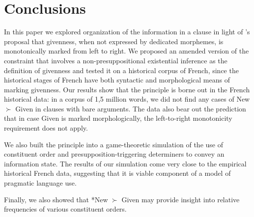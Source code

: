 \documentclass[output=paper,modfonts,nonflat]{langsci/langscibook}
\begin{document}
\section{Conclusions}
\label{section:conclusions}



In this paper we explored organization of the information in a clause in light of \citet{Kucerova:2012}'s proposal that givenness, when not expressed by dedicated morphemes, is monotonically marked from left to right. We proposed an amended version of the constraint that involves a non-presuppositional existential inference as the definition of givenness and tested it on a historical corpus of French, since the historical stages of French have both syntactic and \linebreak morphological means of marking givenness. Our results show that the principle is borne out in the French historical data: in a corpus of 1,5 million words, we did not find any cases of New $\succ$ Given in clauses with bare arguments. The data also bear out the prediction that in case Given is marked morphologically, the left-to-right monotonicity requirement does not apply.

We also built the principle into a game-theoretic simulation of the use of constituent order and presupposition-triggering determiners to convey an information state. The results of our simulation come very close to the empirical historical French data, suggesting that it is viable component of a model of pragmatic language use.

Finally, we also showed that *New $\succ$ Given may provide insight into relative frequencies of various constituent orders.


{\sloppy\printbibliography[heading=subbibliography,notkeyword=this]}
\end{document}
